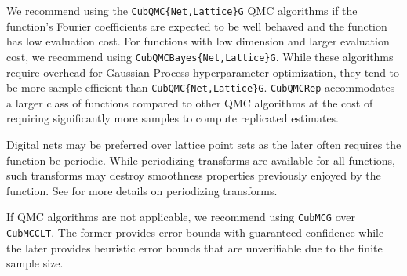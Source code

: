 \documentclass{article}[12pt]
\DeclareMathOperator{\Order}{{\mathcal O}}
\begin{document}
We recommend using the  \texttt{CubQMC\{Net,Lattice\}G} QMC algorithms if the function's Fourier coefficients are expected to be well behaved and the function has low evaluation cost. For functions with low dimension and larger evaluation cost, we recommend using  \texttt{CubQMCBayes\{Net,Lattice\}G}. While these algorithms require overhead for Gaussian Process hyperparameter optimization, they tend to be more sample efficient than \texttt{CubQMC\{Net,Lattice\}G}. \texttt{CubQMCRep} accommodates a larger class of functions compared to other QMC algorithms at the cost of requiring significantly more samples to compute replicated estimates. 

Digital nets may be preferred over lattice point sets as the later often requires the function be periodic. While periodizing transforms are available for all functions, such transforms may destroy smoothness properties previously enjoyed by the function. See  for more details on periodizing transforms. 

If QMC algorithms are not applicable, we recommend using \texttt{CubMCG} over \texttt{CubMCCLT}. The former provides error bounds with guaranteed confidence while the later provides heuristic error bounds that are unverifiable due to the finite sample size. 


\end{document}
